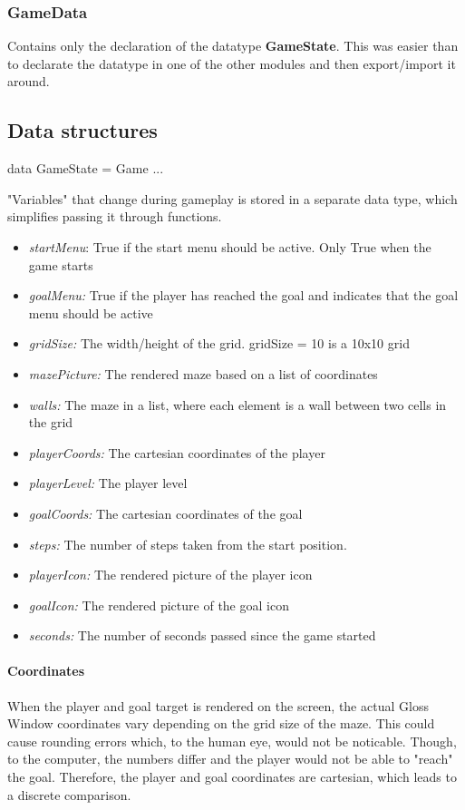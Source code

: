 \documentclass[12pt, a4paper]{article}
\begin{document}
\subsubsection*{GameData}
Contains only the declaration of the datatype \textbf{GameState}. This was easier than to declarate the datatype in one of the other modules and then export/import it around.   

\subsection{Data structures}

\begin{code}
data GameState = Game { ... }
\end{code}
"Variables" that change during gameplay is stored in a separate data type, which simplifies passing it through functions.
\begin{itemize}
    \item \textit{startMenu}: True if the start menu should be active. Only True when the game starts
    \item \textit{goalMenu:} True if the player has reached the goal and indicates that the goal menu should be active
    \item \textit{gridSize:} The width/height of the grid. gridSize = 10 is a 10x10 grid
    \item \textit{mazePicture:} The rendered maze based on a list of coordinates
    \item \textit{walls:} The maze in a list, where each element is a wall between two cells in the grid
    \item \textit{playerCoords:} The cartesian coordinates of the player
    \item \textit{playerLevel:} The player level
    \item \textit{goalCoords:} The cartesian coordinates of the goal
    \item \textit{steps:} The number of steps taken from the start position.
    \item \textit{playerIcon:} The rendered picture of the player icon
    \item \textit{goalIcon:} The rendered picture of the goal icon
    \item \textit{seconds:} The number of seconds passed since the game started
\end{itemize}

\paragraph{Coordinates}
When the player and goal target is rendered on the screen, the actual Gloss Window coordinates vary depending on the grid size of the maze. This could cause rounding errors which, to the human eye, would not be noticable. Though, to the computer, the numbers differ and the player would not be able to "reach" the goal. Therefore, the player and goal coordinates are cartesian, which leads to a discrete comparison.
\end{document}
